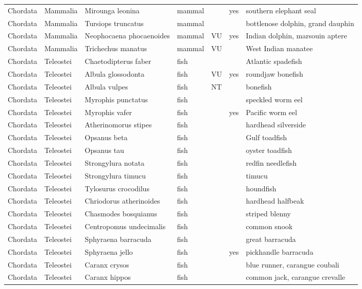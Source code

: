 \begin{longtable}{lllllll}
  Chordata & Mammalia & Mirounga leonina & mammal &  & yes & southern elephant seal \\ 
  Chordata & Mammalia & Tursiops truncatus & mammal &  &  & bottlenose dolphin, grand dauphin \\ 
  Chordata & Mammalia & Neophocaena phocaenoides & mammal & VU & yes & Indian dolphin, marsouin aptere \\ 
  Chordata & Mammalia & Trichechus manatus & mammal & VU &  & West Indian manatee \\ 
  Chordata & Teleostei & Chaetodipterus faber & fish &  &  & Atlantic spadefish \\ 
  Chordata & Teleostei & Albula glossodonta & fish & VU & yes & roundjaw bonefish \\ 
  Chordata & Teleostei & Albula vulpes & fish & NT &  & bonefish \\ 
  Chordata & Teleostei & Myrophis punctatus & fish &  &  & speckled worm eel \\ 
  Chordata & Teleostei & Myrophis vafer & fish &  & yes & Pacific worm eel \\ 
  Chordata & Teleostei & Atherinomorus stipes & fish &  &  & hardhead silverside \\ 
  Chordata & Teleostei & Opsanus beta & fish &  &  & Gulf toadfish \\ 
  Chordata & Teleostei & Opsanus tau & fish &  &  & oyster toadfish \\ 
  Chordata & Teleostei & Strongylura notata & fish &  &  & redfin needlefish \\ 
  Chordata & Teleostei & Strongylura timucu & fish &  &  & timucu \\ 
  Chordata & Teleostei & Tylosurus crocodilus & fish &  &  & houndfish \\ 
  Chordata & Teleostei & Chriodorus atherinoides & fish &  &  & hardhead halfbeak \\ 
  Chordata & Teleostei & Chasmodes bosquianus & fish &  &  & striped blenny \\ 
  Chordata & Teleostei & Centropomus undecimalis & fish &  &  & common snook \\ 
  Chordata & Teleostei & Sphyraena barracuda & fish &  &  & great barracuda \\ 
  Chordata & Teleostei & Sphyraena jello & fish &  & yes & pickhandle barracuda \\ 
  Chordata & Teleostei & Caranx crysos & fish &  &  & blue runner, carangue coubali \\ 
  Chordata & Teleostei & Caranx hippos & fish &  &  & common jack, carangue crevalle \\ 

\end{longtable}
